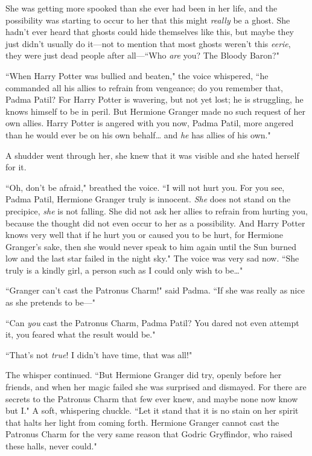 She was getting more spooked than she ever had been in her life, and the possibility was starting to occur to her that this might \emph{really} be a ghost. She hadn't ever heard that ghosts could hide themselves like this, but maybe they just didn't usually do it---not to mention that most ghosts weren't this \emph{eerie}, they were just dead people after all---``Who \emph{are} you? The Bloody Baron?"

``When Harry Potter was bullied and beaten," the voice whispered, ``he commanded all his allies to refrain from vengeance; do you remember that, Padma Patil? For Harry Potter is wavering, but not yet lost; he is struggling, he knows himself to be in peril. But Hermione Granger made no such request of her own allies. Harry Potter is angered with you now, Padma Patil, more angered than he would ever be on his own behalf{\ldots} and \emph{he} has allies of his own."

A shudder went through her, she knew that it was visible and she hated herself for it.

``Oh, don't be afraid," breathed the voice. ``I will not hurt you. For you see, Padma Patil, Hermione Granger truly is innocent. \emph{She} does not stand on the precipice, \emph{she} is not falling. She did not ask her allies to refrain from hurting you, because the thought did not even occur to her as a possibility. And Harry Potter knows very well that if he hurt you or caused you to be hurt, for Hermione Granger's sake, then she would never speak to him again until the Sun burned low and the last star failed in the night sky." The voice was very sad now. ``She truly is a kindly girl, a person such as I could only wish to be{\ldots}"

``Granger can't cast the Patronus Charm!" said Padma. ``If she was really as nice as she pretends to be---"

``Can \emph{you} cast the Patronus Charm, Padma Patil? You dared not even attempt it, you feared what the result would be."

``That's not \emph{true}! I didn't have time, that was all!"

The whisper continued. ``But Hermione Granger did try, openly before her friends, and when her magic failed she was surprised and dismayed. For there are secrets to the Patronus Charm that few ever knew, and maybe none now know but I." A soft, whispering chuckle. ``Let it stand that it is no stain on her spirit that halts her light from coming forth. Hermione Granger cannot cast the Patronus Charm for the very same reason that Godric Gryffindor, who raised these halls, never could."

